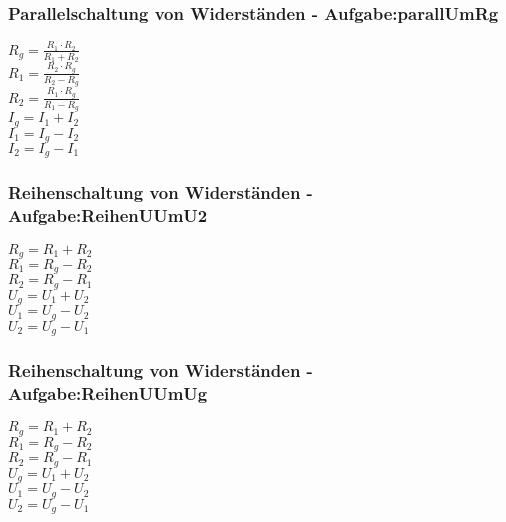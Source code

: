 \subsubsection{Parallelschaltung von Widerständen - Aufgabe:parallUmRg} 
\begin{minipage}{0.45\textwidth} 
$ R_{g}  = \frac{R_{1} \cdot R_{2} }{R_{1} +R_{2} } $\\ 
$ R_{1}  = \frac{R_{2} \cdot R_{g} }{R_{2} -R_{g} } $\\ 
$ R_{2}  = \frac{R_{1} \cdot R_{g} }{R_{1} -R_{g} } $\\ 
$ I_{g}  = I_{1}  + I_{2} $\\ 
$ I_{1}  = I_{g}  - I_{2} $\\ 
$ I_{2}  = I_{g}  - I_{1} $\\ 
\end{minipage} 
\begin{minipage}{0.45\textwidth} 
 
\end{minipage} 
\subsubsection{Reihenschaltung von Widerständen - Aufgabe:ReihenUUmU2} 
\begin{minipage}{0.45\textwidth} 
$ R_{g}  = R_{1}  + R_{2} $\\ 
$ R_{1}  = R_{g}  - R_{2} $\\ 
$ R_{2}  = R_{g}  - R_{1} $\\ 
$ U_{g}  = U_{1}  + U_{2} $\\ 
$ U_{1}  = U_{g}  - U_{2} $\\ 
$ U_{2}  = U_{g}  - U_{1} $\\ 
\end{minipage} 
\begin{minipage}{0.45\textwidth} 
 
\end{minipage} 
\subsubsection{Reihenschaltung von Widerständen - Aufgabe:ReihenUUmUg} 
\begin{minipage}{0.45\textwidth} 
$ R_{g}  = R_{1}  + R_{2} $\\ 
$ R_{1}  = R_{g}  - R_{2} $\\ 
$ R_{2}  = R_{g}  - R_{1} $\\ 
$ U_{g}  = U_{1}  + U_{2} $\\ 
$ U_{1}  = U_{g}  - U_{2} $\\ 
$ U_{2}  = U_{g}  - U_{1} $\\ 
\end{minipage} 
\begin{minipage}{0.45\textwidth} 
 
\end{minipage} 
